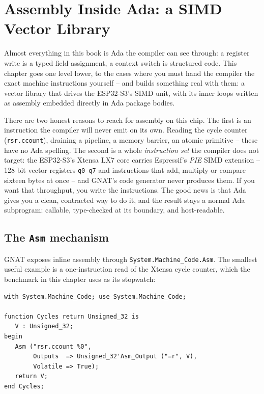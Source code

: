 \chapter{Assembly Inside Ada: a SIMD Vector Library}
\label{ch:asm}

Almost everything in this book is Ada the compiler can see through: a register
write is a typed field assignment, a context switch is structured code. This
chapter goes one level lower, to the cases where you must hand the compiler the
exact machine instructions yourself -- and builds something real with them: a
vector library that drives the ESP32-S3's SIMD unit, with its inner loops written
as assembly embedded directly in Ada package bodies.

There are two honest reasons to reach for assembly on this chip. The first is an
instruction the compiler will never emit on its own. Reading the cycle counter
(\texttt{rsr.ccount}), draining a pipeline, a memory barrier, an atomic primitive --
these have no Ada spelling. The second is a whole \emph{instruction set} the
compiler does not target: the ESP32-S3's Xtensa LX7 core carries Espressif's
\emph{PIE} SIMD extension -- 128-bit vector registers \texttt{q0}--\texttt{q7} and
instructions that add, multiply or compare sixteen bytes at once -- and GNAT's code
generator never produces them. If you want that throughput, you write the
instructions. The good news is that Ada gives you a clean, contracted way to do it,
and the result stays a normal Ada subprogram: callable, type-checked at its
boundary, and host-readable.

\section{The \texttt{Asm} mechanism}

GNAT exposes inline assembly through \texttt{System.Machine\_Code.Asm}. The
smallest useful example is a one-instruction read of the Xtensa cycle counter,
which the benchmark in this chapter uses as its stopwatch:

\begin{lstlisting}
with System.Machine_Code; use System.Machine_Code;

function Cycles return Unsigned_32 is
   V : Unsigned_32;
begin
   Asm ("rsr.ccount %0",
        Outputs  => Unsigned_32'Asm_Output ("=r", V),
        Volatile => True);
   return V;
end Cycles;
\end{lstlisting}

